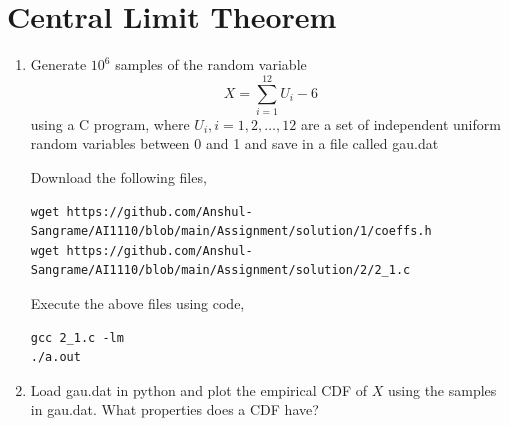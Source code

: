 \documentclass[journal,12pt,twocolumn]{IEEEtran}
\renewcommand\thesection{\arabic{section}}
\begin{document}
\section{Central Limit Theorem}
%
\begin{enumerate}[label=\thesection.\arabic*
,ref=\thesection.\theenumi]
%
\item
Generate $10^6$ samples of the random variable
%
\begin{equation}
X = \sum_{i=1}^{12}U_i -6
\end{equation}
%
using a C program, where $U_i, i = 1,2,\dots, 12$ are  a set of independent uniform random variables between 0 and 1
and save in a file called gau.dat

\solution

Download the following files,
\begin{lstlisting}
wget https://github.com/Anshul-Sangrame/AI1110/blob/main/Assignment/solution/1/coeffs.h
wget https://github.com/Anshul-Sangrame/AI1110/blob/main/Assignment/solution/2/2_1.c
\end{lstlisting}
Execute the above files using code,
\begin{lstlisting}
gcc 2_1.c -lm
./a.out
\end{lstlisting}
%
\item
Load gau.dat in python and plot the empirical CDF of $X$ using the samples in gau.dat. What properties does a CDF have?

\solution 


\end{enumerate}
\end{document}
